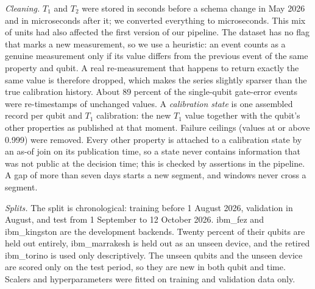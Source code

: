 \documentclass[conference]{IEEEtran}
\begin{document}
\begin{table}[htbp]
\caption{Calibration data used in this study (real IBM records)}
\begin{center}
\label{tab:data}
\end{center}
\end{table}

\textit{Cleaning.} $T_1$ and $T_2$ were stored in seconds before a schema change in May 2026 and in microseconds after it; we converted everything to microseconds. This mix of units had also affected the first version of our pipeline. The dataset has no flag that marks a new measurement, so we use a heuristic: an event counts as a genuine measurement only if its value differs from the previous event of the same property and qubit. A real re-measurement that happens to return exactly the same value is therefore dropped, which makes the series slightly sparser than the true calibration history. About 89 percent of the single-qubit gate-error events were re-timestamps of unchanged values. A \textit{calibration state} is one assembled record per qubit and $T_1$ calibration: the new $T_1$ value together with the qubit's other properties as published at that moment. Failure ceilings (values at or above 0.999) were removed. Every other property is attached to a calibration state by an as-of join on its publication time, so a state never contains information that was not public at the decision time; this is checked by assertions in the pipeline. A gap of more than seven days starts a new segment, and windows never cross a segment.

\textit{Splits.} The split is chronological: training before 1 August 2026, validation in August, and test from 1 September to 12 October 2026. ibm\_fez and ibm\_kingston are the development backends. Twenty percent of their qubits are held out entirely, ibm\_marrakesh is held out as an unseen device, and the retired ibm\_torino is used only descriptively. The unseen qubits and the unseen device are scored only on the test period, so they are new in both qubit and time. Scalers and hyperparameters were fitted on training and validation data only.
\end{document}
